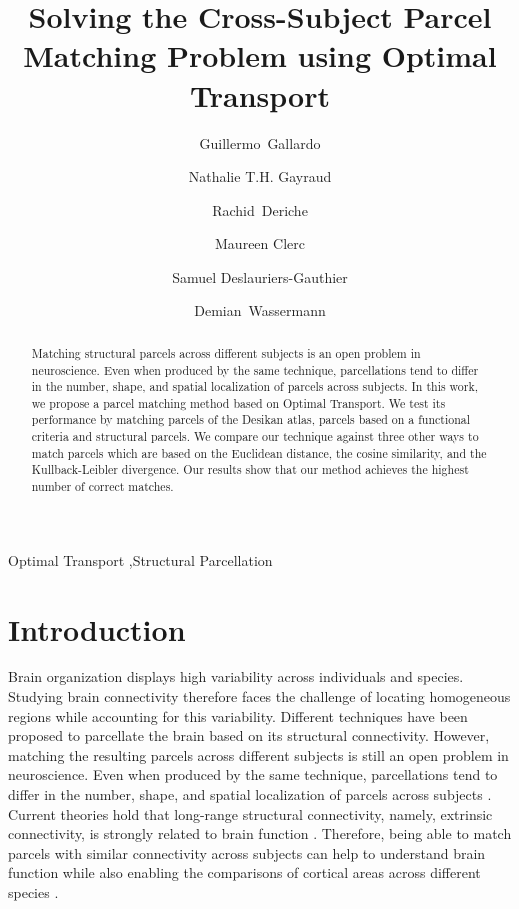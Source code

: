 \begin{frontmatter}
%
\title{Solving the Cross-Subject Parcel Matching Problem using Optimal Transport}
%
\author[nice]{Guillermo~Gallardo}
\author[nice]{Nathalie T.H. Gayraud}
\author[nice]{Rachid~Deriche}
\author[nice]{Maureen Clerc}
\author[nice]{Samuel Deslauriers-Gauthier}
\author[nice]{Demian~Wassermann}
%
\address[nice]{Universit\'e C\^ote d'Azur, Inria, France}
%
\begin{abstract}
Matching structural parcels across different subjects is an open problem in neuroscience.
Even when produced by the same technique, parcellations tend to differ in the number, shape, and spatial localization of parcels across subjects.
In this work, we propose a parcel matching method based on Optimal Transport.
We test its performance by matching parcels of the Desikan atlas, parcels based on a functional criteria and structural parcels.
We compare our technique against three other ways to match parcels which are based on the Euclidean distance, the cosine similarity, and the Kullback-Leibler divergence.
Our results show that our method achieves the highest number of correct matches.
\end{abstract}
%
\begin{keyword}
Optimal Transport \sep Structural Parcellation
\end{keyword}
%
\end{frontmatter}

\section{Introduction}
Brain organization displays high variability across individuals and species. Studying brain connectivity therefore faces the challenge of locating homogeneous regions while accounting for this variability. Different techniques have been proposed to parcellate the brain based on its structural connectivity. However, matching the resulting parcels across different subjects is still an open problem in neuroscience. Even when produced by the same technique, parcellations tend to differ in the number, shape, and spatial localization of parcels across subjects \cite{Jbabdi2013}. Current theories hold that long-range structural connectivity, namely, extrinsic connectivity, is strongly related to brain function \cite{Passingham2002}. Therefore, being able to match parcels with similar connectivity across subjects can help to understand brain function while also enabling the comparisons of cortical areas across different species \cite{Mars2018}.


